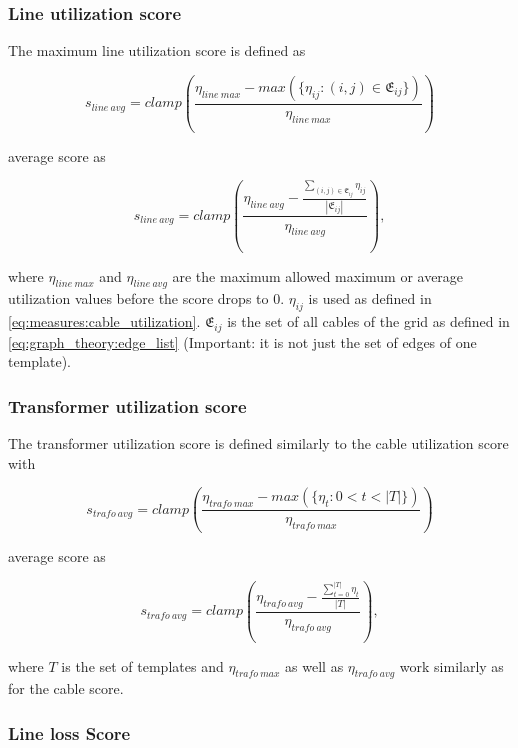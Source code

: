 \subsubsection{Line utilization score}

The maximum line utilization score is defined as

\begin{equation}
    s_{line \ avg} = clamp(\frac{\eta_{line \ max} - max(\{\eta_{ij} : (i, j) \in \mathfrak{E}_{ij}\})}{\eta_{line \ max}})
\end{equation}

average score as

\begin{equation}
    s_{line \ avg} = clamp(\frac{\eta_{line \ avg} - \frac{\sum_{(i, j) \in \mathfrak{E}_{ij}} \eta_{ij}}{|\mathfrak{E}_{ij}|}}{\eta_{line \ avg}}),
\end{equation}

where $\eta_{line \ max}$ and $\eta_{line \ avg}$ are the maximum allowed maximum or average utilization
values before the score drops to 0. $\eta_{ij}$ is used as defined in \autoref{eq:measures:cable_utilization}.
$\mathfrak{E}_{ij}$ is the set of all cables of the grid as defined in \autoref{eq:graph_theory:edge_list}
(Important: it is not just the set of edges of one template).

\subsubsection{Transformer utilization score}

The transformer utilization score is defined similarly to the cable utilization score with

\begin{equation}
    s_{trafo \ avg} = clamp(\frac{\eta_{trafo \ max} - max(\{\eta_{t} : 0 < t < |T|\})}{\eta_{trafo \ max}})
\end{equation}

average score as

\begin{equation}
    s_{trafo \ avg} = clamp(\frac{\eta_{trafo \ avg} - \frac{\sum_{t = 0}^{|T|} \eta_t}{|T|}}{\eta_{trafo \ avg}}),
\end{equation}

where $T$ is the set of templates and $\eta_{trafo \ max}$ as well as $\eta_{trafo \ avg}$ work similarly
as for the cable score.

\subsubsection{Line loss Score}

